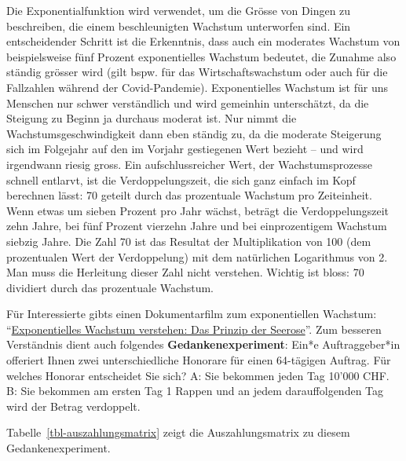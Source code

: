 \documentclass[
  nswissgerman,
  a4paper,
  DIV=11,
  numbers=noendperiod,
  oneside,
  openany]{scrreprt}
\begin{document}
\begin{tcolorbox}[enhanced jigsaw, arc=.35mm, bottomrule=.15mm, bottomtitle=1mm, breakable, colback=white, colbacktitle=quarto-callout-tip-color!10!white, colframe=quarto-callout-tip-color-frame, coltitle=black, left=2mm, leftrule=.75mm, opacityback=0, opacitybacktitle=0.6, rightrule=.15mm, title={Exkurs exponentielles Wachstum}, titlerule=0mm, toprule=.15mm, toptitle=1mm]

Die Exponentialfunktion wird verwendet, um die Grösse von Dingen zu
beschreiben, die einem beschleunigten Wachstum unterworfen sind. Ein
entscheidender Schritt ist die Erkenntnis, dass auch ein moderates
Wachstum von beispielsweise fünf Prozent exponentielles Wachstum
bedeutet, die Zunahme also ständig grösser wird (gilt bspw. für das
Wirtschaftswachstum oder auch für die Fallzahlen während der
Covid-Pandemie). Exponentielles Wachstum ist für uns Menschen nur schwer
verständlich und wird gemeinhin unterschätzt, da die Steigung zu Beginn
ja durchaus moderat ist. Nur nimmt die Wachstumsgeschwindigkeit dann
eben ständig zu, da die moderate Steigerung sich im Folgejahr auf den im
Vorjahr gestiegenen Wert bezieht -- und wird irgendwann riesig gross.
Ein aufschlussreicher Wert, der Wachstumsprozesse schnell entlarvt, ist
die Verdoppelungszeit, die sich ganz einfach im Kopf berechnen lässt: 70
geteilt durch das prozentuale Wachstum pro Zeiteinheit. Wenn etwas um
sieben Prozent pro Jahr wächst, beträgt die Verdoppelungszeit zehn
Jahre, bei fünf Prozent vierzehn Jahre und bei einprozentigem Wachstum
siebzig Jahre. Die Zahl 70 ist das Resultat der Multiplikation von 100
(dem prozentualen Wert der Verdoppelung) mit dem natürlichen Logarithmus
von 2. Man muss die Herleitung dieser Zahl nicht verstehen. Wichtig ist
bloss: 70 dividiert durch das prozentuale Wachstum.

Für Interessierte gibts einen Dokumentarfilm zum exponentiellen
Wachstum:
``\href{https://www.3sat.de/wissen/wissenschaftsdoku/211216-sendung-wido-100.html}{Exponentielles
Wachstum verstehen: Das Prinzip der Seerose}''. Zum besseren Verständnis
dient auch folgendes \textbf{Gedankenexperiment}: Ein*e Auftraggeber*in
offeriert Ihnen zwei unterschiedliche Honorare für einen 64-tägigen
Auftrag. Für welches Honorar entscheidet Sie sich? A: Sie bekommen jeden
Tag 10'000 CHF. B: Sie bekommen am ersten Tag 1 Rappen und an jedem
darauffolgenden Tag wird der Betrag verdoppelt.

Tabelle~\ref{tbl-auszahlungsmatrix} zeigt die Auszahlungsmatrix zu
diesem Gedankenexperiment.


\end{tcolorbox}
\end{document}
